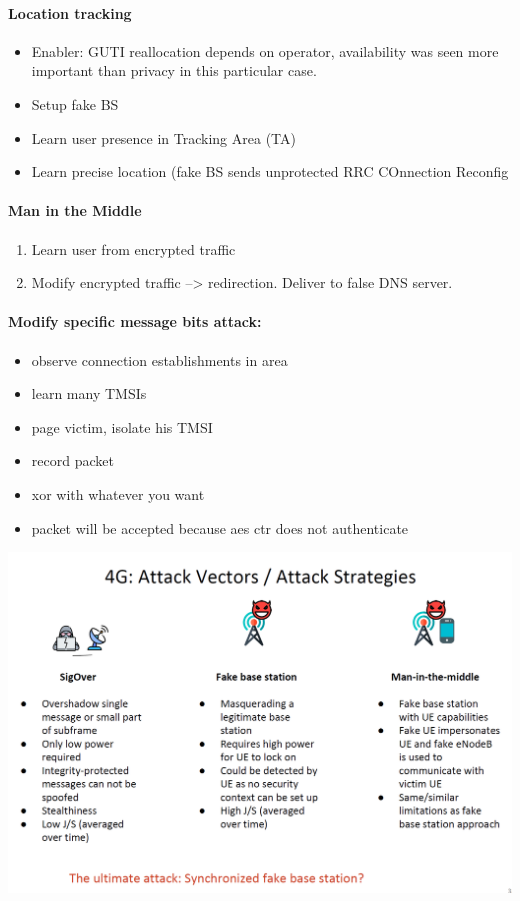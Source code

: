 \paragraph{Location tracking}
\begin{itemize}
    \item Enabler: GUTI reallocation depends on operator, availability was seen more important than privacy in this particular case.
    \item Setup fake BS
    \item Learn user presence in Tracking Area (TA)
    \item Learn precise location (fake BS sends unprotected RRC COnnection Reconfig
\end{itemize}

\paragraph{Man in the Middle}
\begin{enumerate}
    \item Learn user from encrypted traffic
    \item Modify encrypted traffic --> redirection. Deliver to false DNS server.
\end{enumerate}

\paragraph{Modify specific message bits attack:}
\begin{itemize}
    \item observe connection establishments in area
    \item learn many TMSIs
    \item page victim, isolate his TMSI
    \item record packet
    \item xor with whatever you want
    \item packet will be accepted because aes ctr does not authenticate
\end{itemize}

\begin{minipage}{\linewidth}
    \centering      
    \includegraphics[width=\linewidth]{Figures/L10_lte_attacks.PNG}
\end{minipage}

